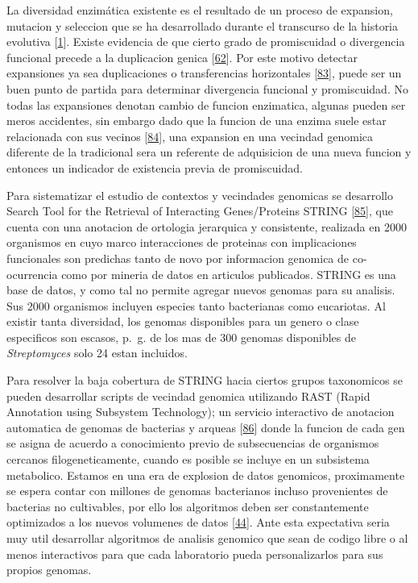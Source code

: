 \documentclass[12pt,twoside]{reedthesis}
\begin{document}
  La diversidad enzimática existente es el resultado de un proceso de
  expansion, mutacion y seleccion que se ha desarrollado durante el
  transcurso de la historia evolutiva
  {[}\protect\hyperlink{ref-khersonsky_enzyme_2010}{1}{]}. Existe
  evidencia de que cierto grado de promiscuidad o divergencia funcional
  precede a la duplicacion genica
  {[}\protect\hyperlink{ref-hughes_evolution_1994}{62}{]}. Por este motivo
  detectar expansiones ya sea duplicaciones o transferencias horizontales
  {[}\protect\hyperlink{ref-treangen_horizontal_2011}{83}{]}, puede ser un
  buen punto de partida para determinar divergencia funcional y
  promiscuidad. No todas las expansiones denotan cambio de funcion
  enzimatica, algunas pueden ser meros accidentes, sin embargo dado que la
  funcion de una enzima suele estar relacionada con sus vecinos
  {[}\protect\hyperlink{ref-overbeek_use_1999}{84}{]}, una expansion en
  una vecindad genomica diferente de la tradicional sera un referente de
  adquisicion de una nueva funcion y entonces un indicador de existencia
  previa de promiscuidad.
  
  Para sistematizar el estudio de contextos y vecindades genomicas se
  desarrollo Search Tool for the Retrieval of Interacting Genes/Proteins
  STRING {[}\protect\hyperlink{ref-snel_string_2000}{85}{]}, que cuenta
  con una anotacion de ortologia jerarquica y consistente, realizada en
  2000 organismos en cuyo marco interacciones de proteinas con
  implicaciones funcionales son predichas tanto de novo por informacion
  genomica de co-ocurrencia como por mineria de datos en articulos
  publicados. STRING es una base de datos, y como tal no permite agregar
  nuevos genomas para su analisis. Sus 2000 organismos incluyen especies
  tanto bacterianas como eucariotas. Al existir tanta diversidad, los
  genomas disponibles para un genero o clase especificos son escasos,
  p.~g. de los mas de 300 genomas disponibles de \emph{Streptomyces} solo
  24 estan incluidos.
  
  Para resolver la baja cobertura de STRING hacia ciertos grupos
  taxonomicos se pueden desarrollar scripts de vecindad genomica
  utilizando RAST (Rapid Annotation using Subsystem Technology); un
  servicio interactivo de anotacion automatica de genomas de bacterias y
  arqueas {[}\protect\hyperlink{ref-aziz_rast_2008}{86}{]} donde la
  funcion de cada gen se asigna de acuerdo a conocimiento previo de
  subsecuencias de organismos cercanos filogeneticamente, cuando es
  posible se incluye en un subsistema metabolico. Estamos en una era de
  explosion de datos genomicos, proximamente se espera contar con millones
  de genomas bacterianos incluso provenientes de bacterias no cultivables,
  por ello los algoritmos deben ser constantemente optimizados a los
  nuevos volumenes de datos
  {[}\protect\hyperlink{ref-medema_computational_2015}{44}{]}. Ante esta
  expectativa seria muy util desarrollar algoritmos de analisis genomico
  que sean de codigo libre o al menos interactivos para que cada
  laboratorio pueda personalizarlos para sus propios genomas.
  
\end{document}
